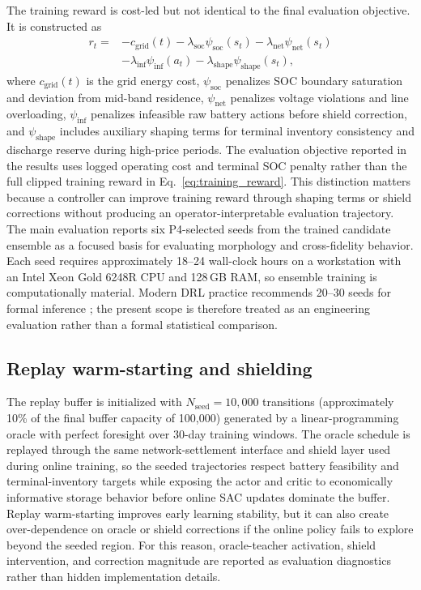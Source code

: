 The training reward is cost-led but not identical to the final evaluation objective. It is constructed as
\begin{equation}
\begin{aligned}
r_t ={}& -c_{\mathrm{grid}}(t)
- \lambda_{\mathrm{soc}} \psi_{\mathrm{soc}}(s_t)
- \lambda_{\mathrm{net}} \psi_{\mathrm{net}}(s_t) \\
&- \lambda_{\mathrm{inf}} \psi_{\mathrm{inf}}(a_t)
- \lambda_{\mathrm{shape}} \psi_{\mathrm{shape}}(s_t),
\end{aligned}
\label{eq:training_reward}
\end{equation}
where $c_{\mathrm{grid}}(t)$ is the grid energy cost, $\psi_{\mathrm{soc}}$ penalizes SOC boundary saturation and deviation from mid-band residence, $\psi_{\mathrm{net}}$ penalizes voltage violations and line overloading, $\psi_{\mathrm{inf}}$ penalizes infeasible raw battery actions before shield correction, and $\psi_{\mathrm{shape}}$ includes auxiliary shaping terms for terminal inventory consistency and discharge reserve during high-price periods. The evaluation objective reported in the results uses logged operating cost and terminal SOC penalty rather than the full clipped training reward in Eq.~\eqref{eq:training_reward}. This distinction matters because a controller can improve training reward through shaping terms or shield corrections without producing an operator-interpretable evaluation trajectory. The main evaluation reports six P4-selected seeds from the trained candidate ensemble as a focused basis for evaluating morphology and cross-fidelity behavior. Each seed requires approximately 18--24 wall-clock hours on a workstation with an Intel Xeon Gold 6248R CPU and 128\,GB RAM, so ensemble training is computationally material. Modern DRL practice recommends 20--30 seeds for formal inference \cite{agarwal2021statistical}; the present scope is therefore treated as an engineering evaluation rather than a formal statistical comparison.

\subsection{Replay warm-starting and shielding}

The replay buffer is initialized with $N_{\mathrm{seed}} = 10{,}000$ transitions (approximately 10\% of the final buffer capacity of 100{,}000) generated by a linear-programming oracle with perfect foresight over 30-day training windows. The oracle schedule is replayed through the same network-settlement interface and shield layer used during online training, so the seeded trajectories respect battery feasibility and terminal-inventory targets while exposing the actor and critic to economically informative storage behavior before online SAC updates dominate the buffer. Replay warm-starting improves early learning stability, but it can also create over-dependence on oracle or shield corrections if the online policy fails to explore beyond the seeded region. For this reason, oracle-teacher activation, shield intervention, and correction magnitude are reported as evaluation diagnostics rather than hidden implementation details.

